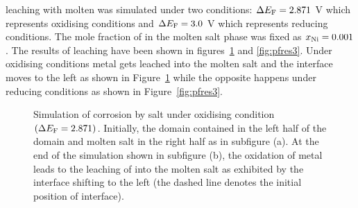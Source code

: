  leaching with molten  was simulated under two conditions: $\Delta E_{\ce{F}} = 2.871$ \si{\volt} which represents oxidising conditions and $\Delta E_{\ce{F}} = 3.0$ \si{\volt} which represents reducing conditions. The mole fraction of  in the molten salt phase was fixed as $x_{\ce{Ni}} = 0.001$. The results of  leaching have been shown in figures~\ref{fig:pfres2} and \ref{fig:pfres3}. Under oxidising conditions  metal gets leached into the molten salt and the interface moves to the left as shown in Figure~\ref{fig:pfres2} while the opposite happens under reducing conditions as shown in  Figure~\ref{fig:pfres3}. 
\begin{figure}[!ht]
    \hfill
    \caption[ corrosion by  salt under oxidising condition $\left(\Delta E_{\ce{F}} = 2.871\right)$.]{Simulation of  corrosion by  salt under oxidising condition $\left(\Delta E_{\ce{F}} = 2.871\right)$. Initially, the domain contained  in the left half of the domain and molten salt in the right half as in subfigure (a). At the end of the simulation shown in subfigure (b), the oxidation of  metal leads to the leaching of  into the molten salt as exhibited by the interface shifting to the left (the dashed line denotes the initial position of interface).}
    \label{fig:pfres2}
\end{figure}

